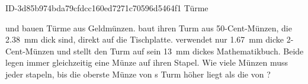 \begin{exercise}
      {ID-3d85b974bda79cfdcc160ed7271c70596d5464f1}
      {Türme}
  \ifproblem\problem\par
    \xxa{} und \xyb{} bauen Türme aus Geldmünzen. \xxa{} baut ihren Turm aus
    50-Cent-Münzen, die \SI{2.38}{\milli\metre} dick sind, direkt auf die
    Tischplatte. \xyb{} verwendet nur \SI{1.67}{\milli\metre} dicke 2-Cent-Münzen
    und stellt den Turm auf sein \SI{13}{\milli\metre} dickes Mathematikbuch.
    Beide legen immer gleichzeitig eine Münze auf ihren Stapel. Wie viele Münzen
    muss jeder stapeln, bis die oberste Münze von \xxa s Turm höher liegt als die
    von \xyb?
  \fi
\end{exercise}
